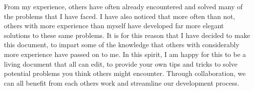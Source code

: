 %
%
\par
%
%
From my experience, others have often already encountered and solved many of the problems that I have faced. I have also noticed that more often than not, others with more experience than myself have developed far more elegant solutions to these same problems. It is for this reason that I have decided to make this document, to impart some of the knowledge that others with considerably more experience have passed on to me. In this spirit, I am happy for this to be a living document that all can edit, to provide your own tips and tricks to solve potential problems you think others might encounter. Through collaboration, we can all benefit from each others work and streamline our development process.
%
%
%
%
